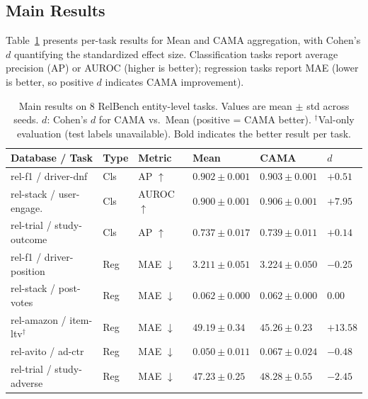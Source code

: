 \documentclass[11pt,letterpaper]{article}
\begin{document}
\subsection{Main Results}
\label{sec:main_results}

Table~\ref{tab:main} presents per-task results for Mean and CAMA aggregation, with Cohen's $d$ quantifying the standardized effect size. Classification tasks report average precision (AP) or AUROC (higher is better); regression tasks report MAE (lower is better, so positive $d$ indicates CAMA improvement).

\begin{table}[!htbp]
\centering
\caption{Main results on 8 RelBench entity-level tasks. Values are mean $\pm$ std across seeds. $d$: Cohen's $d$ for CAMA vs.\ Mean (positive = CAMA better). $^\dagger$Val-only evaluation (test labels unavailable). Bold indicates the better result per task.}
\label{tab:main}
\small
\begin{tabular}{@{}llllll@{}}
\toprule
Database / Task & Type & Metric & Mean & CAMA & $d$ \\
\midrule
rel-f1 / driver-dnf & Cls & AP $\uparrow$ & $0.902 \pm 0.001$ & $\mathbf{0.903} \pm 0.001$ & $+0.51$ \\
rel-stack / user-engage. & Cls & AUROC $\uparrow$ & $0.900 \pm 0.001$ & $\mathbf{0.906} \pm 0.001$ & $+7.95$ \\
rel-trial / study-outcome & Cls & AP $\uparrow$ & $0.737 \pm 0.017$ & $\mathbf{0.739} \pm 0.011$ & $+0.14$ \\
\midrule
rel-f1 / driver-position & Reg & MAE $\downarrow$ & $\mathbf{3.211} \pm 0.051$ & $3.224 \pm 0.050$ & $-0.25$ \\
rel-stack / post-votes & Reg & MAE $\downarrow$ & $0.062 \pm 0.000$ & $0.062 \pm 0.000$ & $0.00$ \\
rel-amazon / item-ltv$^\dagger$ & Reg & MAE $\downarrow$ & $49.19 \pm 0.34$ & $\mathbf{45.26} \pm 0.23$ & $+13.58$ \\
rel-avito / ad-ctr & Reg & MAE $\downarrow$ & $\mathbf{0.050} \pm 0.011$ & $0.067 \pm 0.024$ & $-0.48$ \\
rel-trial / study-adverse & Reg & MAE $\downarrow$ & $\mathbf{47.23} \pm 0.25$ & $48.28 \pm 0.55$ & $-2.45$ \\
\bottomrule
\end{tabular}
\end{table}
\end{document}
